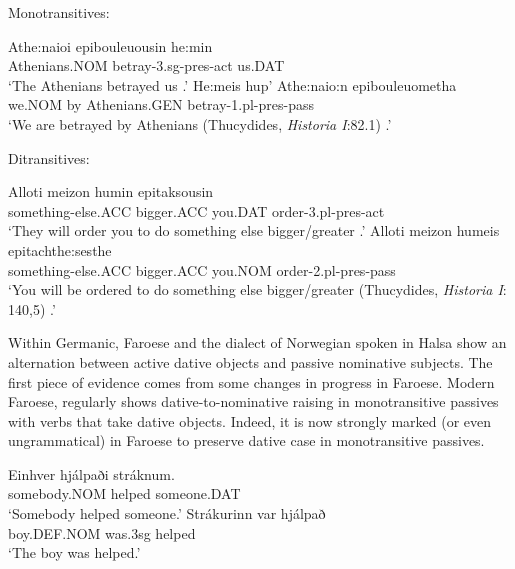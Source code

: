 \begin{exe}
\ex Monotransitives:
\begin{xlist}
\ex \gll Athe:naioi epibouleuousin he:min\\
Athenians.NOM betray-3.sg-pres-act us.DAT\\
\trans `The Athenians betrayed us \citep[ex 1a]{Alexiadou.2013b}.'
\ex \gll He:meis hup' Athe:naio:n epibouleuometha\\
we.NOM by Athenians.GEN betray-1.pl-pres-pass\\
\trans `We are betrayed by Athenians (Thucydides, \emph{Historia I}:82.1) \citep[ex 1b]{Alexiadou.2013b}.'
\end{xlist}
\ex Ditransitives:
\begin{xlist}
\ex \gll Alloti meizon humin epitaksousin\\
something-else.ACC bigger.ACC you.DAT order-3.pl-pres-act\\
\trans `They will order you to do something else bigger/greater \citep[ex 2a]{Alexiadou.2013b}.'
\ex \gll Alloti meizon humeis epitachthe:sesthe\\
something-else.ACC bigger.ACC you.NOM order-2.pl-pres-pass\\
\trans `You will be ordered to do something else bigger/greater (Thucydides, \emph{Historia I}: 140,5) \citep[ex 2b]{Alexiadou.2013b}.'
\end{xlist}
\end{exe}

Within Germanic, Faroese and the dialect of Norwegian spoken in Halsa show an alternation between active dative objects and passive nominative subjects. The first piece of evidence comes from some changes in progress in Faroese. Modern Faroese, regularly shows dative-to-nominative raising in monotransitive passives with verbs that take dative objects. Indeed, it is now strongly marked (or even ungrammatical) in Faroese to preserve dative case in monotransitive passives.

\begin{exe}
\ex
\begin{xlist}
\ex \gll Einhver hjálpaði stráknum.\\
somebody.NOM helped someone.DAT\\
\trans `Somebody helped someone.'
\ex \gll Strákurinn var hjálpað\\
boy.DEF.NOM was.3sg helped\\
\trans `The boy was helped.'
\end{xlist}
\end{exe}

